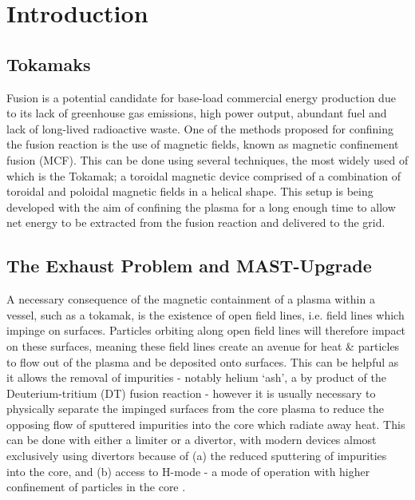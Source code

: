 \documentclass[a4paper, 12pt]{article} %
\begin{document}
\section{\label{sec:intro}Introduction}

\subsection{\label{subsec:tokamaks}Tokamaks}
	Fusion is a potential candidate for base-load commercial energy production due to its lack of greenhouse gas emissions, high power output, abundant fuel and lack of long-lived radioactive waste.
	One of the methods proposed for confining the fusion reaction is the use of magnetic fields, known as magnetic confinement fusion (MCF).
	This can be done using several techniques, the most widely used of which is the Tokamak; a toroidal magnetic device comprised of a combination of toroidal and poloidal magnetic fields in a helical shape. 
	This setup is being developed with the aim of confining the plasma for a long enough time to allow net energy to be extracted from the fusion reaction and delivered to the grid.  
	
\subsection{\label{subsec:exhaust}The Exhaust Problem and MAST-Upgrade}
	A necessary consequence of the magnetic containment of a plasma within a vessel, such as a tokamak, is the existence of open field lines, i.e. field lines which impinge on surfaces. 
	Particles orbiting along open field lines will therefore impact on these surfaces, meaning these field lines create an avenue for heat \& particles to flow out of the plasma and be deposited onto surfaces.
	This can be helpful as it allows the removal of impurities - notably helium `ash', a by product of the Deuterium-tritium (DT) fusion reaction - however it is usually necessary to physically separate the impinged surfaces from the core plasma to reduce the opposing flow of sputtered impurities into the core which radiate away heat. 
	This can be done with either a limiter or a divertor\cite{Wesson2011}, with modern devices almost exclusively using divertors because of (a) the reduced sputtering of impurities into the core, and (b) access to H-mode - a mode of operation with higher confinement of particles in the core \cite{Itoh1989}.
	
\end{document}
